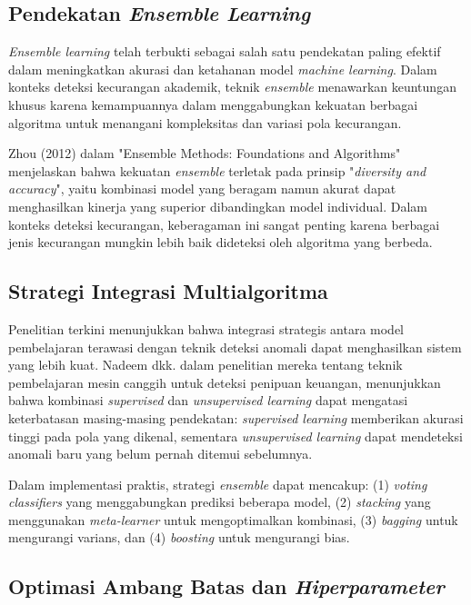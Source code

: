 \subsection{Pendekatan \textit{Ensemble Learning}}

\textit{Ensemble learning} telah terbukti sebagai salah satu pendekatan paling efektif dalam meningkatkan akurasi dan ketahanan model \textit{machine learning}. Dalam konteks deteksi kecurangan akademik, teknik \textit{ensemble} menawarkan keuntungan khusus karena kemampuannya dalam menggabungkan kekuatan berbagai algoritma untuk menangani kompleksitas dan variasi pola kecurangan.

Zhou (2012) dalam "Ensemble Methods: Foundations and Algorithms" menjelaskan bahwa kekuatan \textit{ensemble} terletak pada prinsip "\textit{diversity and accuracy}", yaitu kombinasi model yang beragam namun akurat dapat menghasilkan kinerja yang superior dibandingkan model individual. Dalam konteks deteksi kecurangan, keberagaman ini sangat penting karena berbagai jenis kecurangan mungkin lebih baik dideteksi oleh algoritma yang berbeda.

\subsection{Strategi Integrasi Multialgoritma}

Penelitian terkini menunjukkan bahwa integrasi strategis antara model pembelajaran terawasi dengan teknik deteksi anomali dapat menghasilkan sistem yang lebih kuat. Nadeem dkk. \cite{Nadeem2024} dalam penelitian mereka tentang teknik pembelajaran mesin canggih untuk deteksi penipuan keuangan, menunjukkan bahwa kombinasi \textit{supervised} dan \textit{unsupervised learning} dapat mengatasi keterbatasan masing-masing pendekatan: \textit{supervised learning} memberikan akurasi tinggi pada pola yang dikenal, sementara \textit{unsupervised learning} dapat mendeteksi anomali baru yang belum pernah ditemui sebelumnya.

Dalam implementasi praktis, strategi \textit{ensemble} dapat mencakup: (1) \textit{voting classifiers} yang menggabungkan prediksi beberapa model, (2) \textit{stacking} yang menggunakan \textit{meta-learner} untuk mengoptimalkan kombinasi, (3) \textit{bagging} untuk mengurangi varians, dan (4) \textit{boosting} untuk mengurangi bias.

\subsection{Optimasi Ambang Batas dan \textit{Hiperparameter}}

